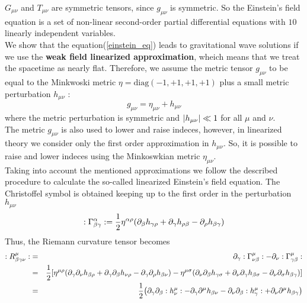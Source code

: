 $G_{\mu \nu}$ and $T_{\mu \nu}$ are symmetric tensors, since $g_{\mu \nu}$ is symmetric.
So the Einstein's field equation is a set of non-linear second-order partial differential equations with $10$ linearly independent variables. \\
We show that the equation(\ref{einstein_eq}) leads to gravitational wave solutions if we use the \textbf{weak field linearized approximation}, wheich means that we treat the spacetime as nearly flat. 
Therefore, we assume the metric tensor $g_{\mu \nu}$ to be equal to the Minkwoski metric $\eta=\text{diag}(-1,+1,+1,+1)$ plus a small metric perturbation $h_{\mu \nu}$ :
\begin{equation}
\label{metric}
g_{\mu \nu} = \eta_{\mu \nu} + h_{\mu \nu}
\end{equation}
where the metric perturbation is symmetric and $\abs{h_{\mu \nu}}\ll 1$ for all $\mu$ and $\nu$. \\
The metric $g_{\mu \nu}$ is also used to lower and raise indeces, however, in linearized theory we consider only the first order approximation in $h_{\mu \nu}$. So, it is possible to raise and lower indeces using the Minkoswkian metric $\eta_{\mu \nu}$.\\ %
Taking into account the mentioned approximations we follow the described procedure to calculate the so-called linearized Einstein's field equation.
The Christoffel symbol is obtained keeping up to the first order in the perturbation $h_{\mu \nu}$
\[
:\Gamma ^\alpha _{\beta \gamma}: = 
\dfrac{1}{2} \eta^{\alpha \rho}
\qty(
\partial_\beta h_{\gamma \rho } 
+
 \partial_\gamma h_{\rho \beta}
-
\partial_\rho h _{\beta \gamma}
) 
\]
Thus, the Riemann curvature tensor becomes 
\setlength{\jot}{10pt}
\begin{eqnarray}
:R^\mu _{\beta \gamma \de }: &=&  \notag
\partial_\gamma :\Gamma ^\mu _{\de \beta}: -
\partial_\de :\Gamma ^\mu _{\gamma \beta}: 
\\ \notag
&=& 
\dfrac{1}{2} 
\qty[
\eta^{\mu \rho} 
\qty(
\partial_\gamma \partial_\de h_{\beta \rho} + %
\partial_\gamma \partial_\beta h_{\de \rho} -
\partial_\gamma \partial_\rho h_{\beta \de}
)
-
\eta^{\mu \sigma} 
\qty(
\partial_\de \partial_\beta h_{\gamma \sigma} +
\partial_\de \partial_\gamma h_{\beta \sigma} - %
\partial_\de \partial_\sigma h_{\beta \gamma}
)
]
\\ 
&=&
\label{reimann_curvature_tensor_first_order}
\dfrac{1}{2} \qty(
\partial_\gamma \partial_\beta :h ^\mu _{\de}: -
\partial_\gamma \partial^\mu h_{\beta \de} -
\partial_\de \partial_\beta :h^\mu _{ \gamma} : +
\partial_\de \partial^\mu h_{\beta \gamma}
)
\end{eqnarray}

